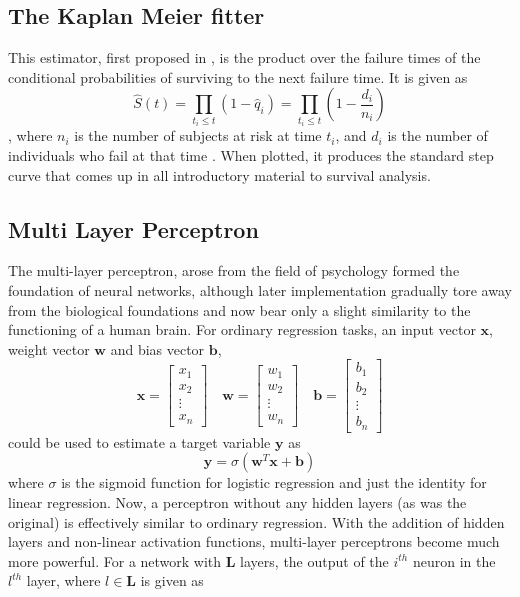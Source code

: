 \documentclass[%
 reprint,
 amsmath,amssymb,
 aps,nofootinbib
]{revtex4-2}
\begin{document}
\subsection{\label{non_param}The Kaplan Meier fitter}

This estimator, first proposed in \cite{km_curve}, is the product over the failure times of the conditional probabilities of surviving to the next failure time. It is given as
\[
\hat{S}(t) = \prod_{t_i \le t}(1 - \hat{q}_i) = \prod_{t_i \le t}(1 - \frac{d_i}{n_i})
\],
where $n_i$ is the number of subjects at risk at time $t_i$, and $d_i$ is the number of individuals who fail at that time \cite{Moore_2016}. When plotted, it produces the standard step curve that comes up in all introductory material to survival analysis.

\subsection{\label{non_param}Multi Layer Perceptron}
The multi-layer perceptron, arose from the field of psychology \cite{mlp} formed the foundation of neural networks, although later implementation gradually tore away from the biological foundations and now bear only a slight similarity to the functioning of a human brain. For ordinary regression tasks, an input vector $\mathbf{x}$, weight vector $\mathbf{w}$ and bias vector $\mathbf{b}$,
\[
\mathbf{x} = \begin{bmatrix}
x_1 \\
x_2 \\
\vdots \\
x_n
\end{bmatrix}
\quad
\mathbf{w} = \begin{bmatrix}
w_1 \\
w_2 \\
\vdots \\
w_n
\end{bmatrix}
\quad
\mathbf{b} = \begin{bmatrix}
b_1 \\
b_2 \\
\vdots \\
b_n
\end{bmatrix}
\]
could be used to estimate a target variable $\mathbf{y}$ as 
\[
\mathbf{y} = \sigma(\mathbf{w}^T\mathbf{x}+\mathbf{b})
\]
where $\sigma$ is the sigmoid function for logistic regression and just the identity for linear regression. Now, a perceptron without any hidden layers (as was the original) is effectively similar to ordinary regression. With the addition of hidden layers and non-linear activation functions, multi-layer perceptrons become much more powerful. For a network with $\mathbf{L}$ layers, the output of the $i^{th}$ neuron in the $l^{th}$ layer, where $l \in \mathbf{L}$ is given as
\end{document}
